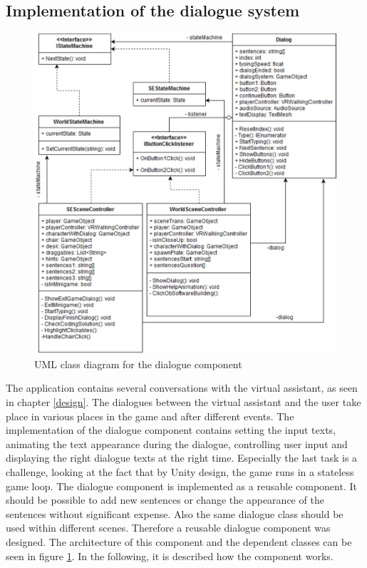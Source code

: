 \subsection{Implementation of the dialogue system}
\begin{figure}[h!]
  \includegraphics[width=13cm]{kapitel/eps/uml-dialog.pdf}
  \centering
  \caption{UML class diagram for the dialogue component}
  \label{fig:uml-controller}
\end{figure}
The application contains several conversations with the virtual assistant, as seen in chapter \ref{design}. The dialogues between the virtual assistant and the user take place in various places in the game and after different events. The implementation of the dialogue component contains setting the input texts, animating the text appearance during the dialogue, controlling user input and displaying the right dialogue texts at the right time. Especially the last task is a challenge, looking at the fact that by Unity design, the game runs in a stateless game loop. The dialogue component is implemented as a reusable component. It should be possible to add new sentences or change the appearance of the sentences without significant expense. Also the same dialogue class should be used within different scenes. Therefore a reusable dialogue component was designed. The architecture of this component and the dependent classes can be seen in figure \ref{fig:uml-controller}. In the following, it is described how the component works.\\

